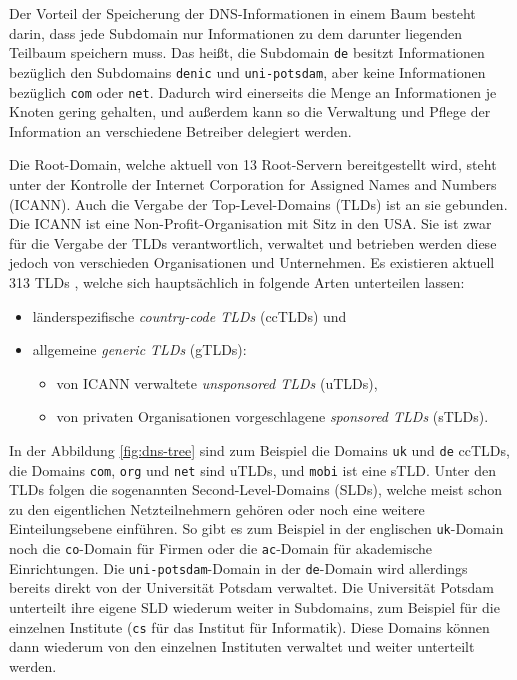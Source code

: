 \documentclass[a4paper, 12pt, BCOR10mm, DIV12, toc=bibliography, toc=listof, german]{scrbook}
\begin{document}
			Der Vorteil der Speicherung der DNS-Informationen in einem Baum besteht darin, dass jede Subdomain
			nur Informationen zu dem darunter liegenden Teilbaum speichern muss. Das heißt, die Subdomain
			\texttt{de} besitzt Informationen bezüglich den Subdomains \texttt{denic} und
			\texttt{uni-potsdam}, aber keine Informationen bezüglich \texttt{com} oder \texttt{net}.
			Dadurch wird einerseits die Menge an Informationen je Knoten gering gehalten, und außerdem
			kann so die Verwaltung und Pflege der Information an verschiedene Betreiber delegiert werden.

			Die Root-Domain, welche aktuell von 13 Root-Servern \cite{rootserver} bereitgestellt wird,
			steht unter der Kontrolle der Internet Corporation for Assigned Names and Numbers (ICANN). Auch
			die Vergabe der Top-Level-Domains (TLDs) ist an sie gebunden. Die ICANN ist eine
			Non-Profit-Organisation mit Sitz in den USA. Sie ist zwar für die Vergabe der TLDs
			verantwortlich, verwaltet und betrieben werden diese jedoch von verschieden Organisationen und
			Unternehmen. Es existieren aktuell 313 TLDs \cite{tlds}, welche sich hauptsächlich in folgende
			Arten unterteilen lassen:

			\begin{itemize}
				\item länderspezifische \textit{country-code TLDs} (ccTLDs) und
				\item allgemeine \textit{generic TLDs} (gTLDs):
				\begin{itemize}
					\item von ICANN verwaltete \textit{unsponsored TLDs} (uTLDs),
					\item von privaten Organisationen vorgeschlagene \textit{sponsored TLDs} (sTLDs).
				\end{itemize}
			\end{itemize}

			In der Abbildung \ref{fig:dns-tree} sind zum Beispiel die Domains \texttt{uk} und \texttt{de}
			ccTLDs, die Domains \texttt{com}, \texttt{org} und \texttt{net} sind uTLDs, und \texttt{mobi}
			ist eine sTLD. Unter den TLDs folgen die sogenannten Second-Level-Domains (SLDs), welche meist
			schon zu den eigentlichen Netzteilnehmern gehören oder noch eine weitere Einteilungsebene
			einführen. So gibt es zum Beispiel in der englischen \texttt{uk}-Domain noch die
			\texttt{co}-Domain für Firmen oder die \texttt{ac}-Domain für akademische Einrichtungen. Die
			\texttt{uni-potsdam}-Domain in der \texttt{de}-Domain wird allerdings bereits direkt von der
			Universität Potsdam verwaltet. Die Universität Potsdam unterteilt ihre eigene SLD wiederum
			weiter in Subdomains, zum Beispiel für die einzelnen Institute (\texttt{cs} für das Institut
			für Informatik). Diese Domains können dann wiederum von den einzelnen Instituten verwaltet und
			weiter unterteilt werden.
\end{document}
